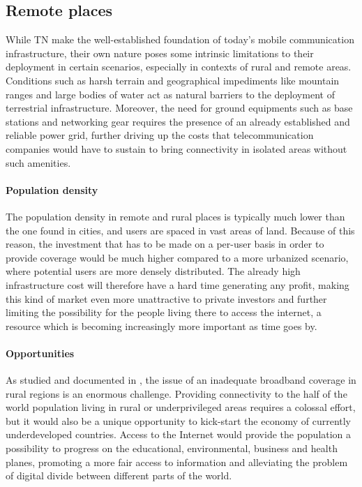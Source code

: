 \subsection{Remote places}
While \ac{TN} make the well-established foundation of today’s mobile communication infrastructure, their own nature poses some intrinsic limitations to their deployment in certain scenarios, especially in contexts of rural and remote areas. Conditions such as harsh terrain and geographical impediments like mountain ranges and large bodies of water act as natural barriers to the deployment of terrestrial infrastructure. Moreover, the need for ground equipments such as base stations and networking gear requires the presence of an already established and reliable power grid, further driving up the costs that telecommunication companies would have to sustain to bring connectivity in isolated areas without such amenities.

\paragraph{Population density}
The population density in remote and rural places is typically much lower than the one found in cities, and users are spaced in vast areas of land. Because of this reason, the investment that has to be made on a per-user basis in order to provide coverage would be much higher compared to a more urbanized scenario, where potential users are more densely distributed. The already high infrastructure cost will therefore have a hard time generating any profit, making this kind of market even more unattractive to private investors and further limiting the possibility for the people living there to access the internet, a resource which is becoming increasingly more important as time goes by.

\paragraph{Opportunities}
As studied and documented in \cite{6g-challenge-opportunity-base-pyramid}, the issue of an inadequate broadband coverage in rural regions is an enormous challenge. Providing connectivity to the half of the world population living in rural or underprivileged areas requires a colossal effort, but it would also be a unique opportunity to kick-start the economy of currently underdeveloped countries. Access to the Internet would provide the population a possibility to progress on the educational, environmental, business and health planes, promoting a more fair access to information and alleviating the problem of digital divide between different parts of the world.

